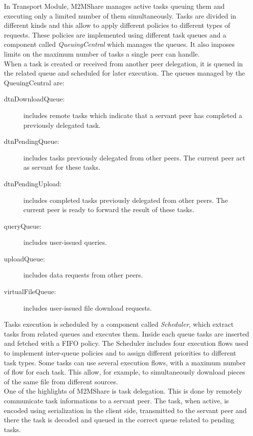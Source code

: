 In Transport Module, M2MShare manages active tasks queuing them and executing only a limited number of them simultaneously. Tasks are divided in different kinds and this allow to apply different policies to different types of requests. These policies are implemented using different task queues and a component called \textit{QueuingCentral} which manages the queues. It also imposes limits on the maximum number of tasks a single peer can handle.
\\

When a task is created or received from another peer delegation, it is queued in the related queue and scheduled for later execution. The queues managed by the QueuingCentral are:
\begin{description}
\item[dtnDownloadQueue:] includes remote tasks which indicate that a servant peer has completed a previously delegated task.
\item[dtnPendingQueue:] includes tasks previously delegated from other peers. The current peer act as servant for these tasks.
\item[dtnPendingUpload:] includes completed tasks previously delegated from other peers. The current peer is ready to forward the result of these tasks.
\item[queryQueue:] includes user-issued queries.
\item[uploadQueue:] includes data requests from other peers.
\item[virtualFileQueue:] includes user-issued file download requests.
\end{description}

Tasks execution is scheduled by a component called \textit{Scheduler}, which extract tasks from related queues and executes them. Inside each queue tasks are inserted and fetched with a FIFO policy. The Scheduler includes four execution flows used to implement inter-queue policies and to assign different priorities to different task types. Some tasks can use several execution flows, with a maximum number of flow for each task. This allow, for example, to simultaneously download pieces of the same file from different sources.
\\

One of the highlights of M2MShare is task delegation. This is done by remotely communicate task informations to a servant peer. The task, when active, is encoded using serialization in the client side, transmitted to the servant peer and there the task is decoded and queued in the correct queue related to pending tasks.

